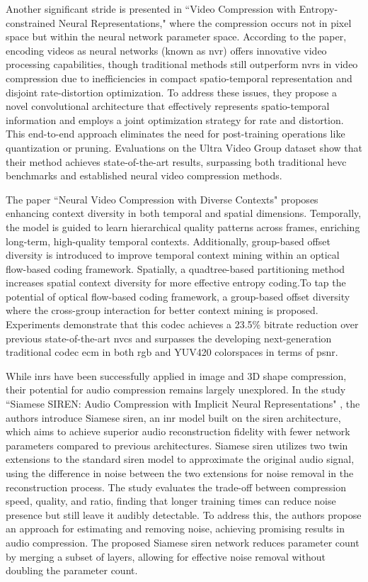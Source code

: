 Another significant stride is presented in ``Video Compression with Entropy-constrained Neural Representations," \cite{Gomes_2023_CVPR} where the compression occurs not in pixel space but within the neural network parameter space. According to the paper, encoding videos as neural networks (known as \gls{nvr}) offers innovative video processing capabilities, though traditional methods still outperform \gls{nvr}s in video compression due to inefficiencies in compact spatio-temporal representation and disjoint rate-distortion optimization. To address these issues, they propose a novel convolutional architecture that effectively represents spatio-temporal information and employs a joint optimization strategy for rate and distortion. This end-to-end approach eliminates the need for post-training operations like quantization or pruning. Evaluations on the Ultra Video Group dataset show that their method achieves state-of-the-art results, surpassing both traditional \gls{hevc} benchmarks and established neural video compression methods. 

The paper ``Neural Video Compression with Diverse Contexts" \cite{li2023neural} proposes enhancing context diversity in both temporal and spatial dimensions. Temporally, the model is guided to learn hierarchical quality patterns across frames, enriching long-term, high-quality temporal contexts. Additionally, group-based offset diversity is introduced to improve temporal context mining within an optical flow-based coding framework. Spatially, a quadtree-based partitioning method increases spatial context diversity for more effective entropy coding.To tap the potential of optical flow-based coding framework, a group-based offset diversity where the cross-group interaction for better context mining is proposed. Experiments demonstrate that this \gls{codec} achieves a 23.5\% bitrate reduction over previous state-of-the-art \gls{nvc}s and surpasses the developing next-generation traditional \gls{codec} \gls{ecm} in both \gls{rgb} and YUV420 colorspaces in terms of \gls{psnr}. 

While \gls{inr}s have been successfully applied in image and 3D shape compression, their potential for audio compression remains largely unexplored. In the study ``Siamese SIREN: Audio Compression with Implicit Neural Representations" \cite{lanzendörfer2023siamese}, the authors introduce Siamese \gls{siren}, an \gls{inr} model built on the \gls{siren} architecture, which aims to achieve superior audio reconstruction fidelity with fewer network parameters compared to previous architectures. Siamese \gls{siren} utilizes two twin extensions to the standard \gls{siren} model to approximate the original audio signal, using the difference in noise between the two extensions for noise removal in the reconstruction process. The study evaluates the trade-off between compression speed, quality, and ratio, finding that longer training times can reduce noise presence but still leave it audibly detectable. To address this, the authors propose an approach for estimating and removing noise, achieving promising results in audio compression. The proposed Siamese \gls{siren} network reduces parameter count by merging a subset of layers, allowing for effective noise removal without doubling the parameter count.

